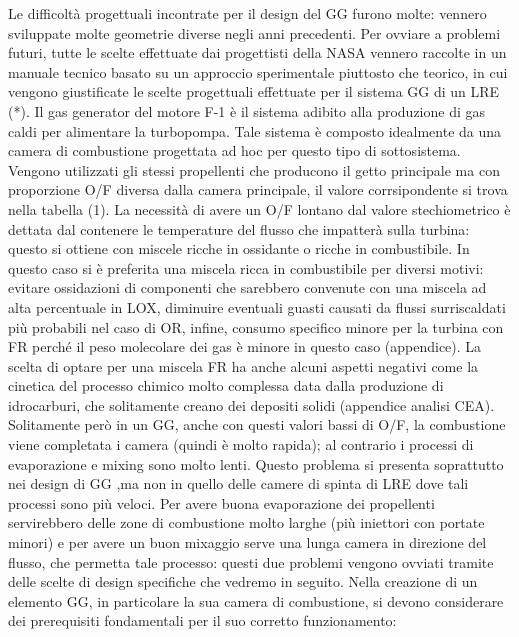 \documentclass[11pt,a4paper,twocolumn]{article}
\begin{document}
\label{sec:gas generator}

Le difficoltà progettuali incontrate per il design del GG furono molte: vennero sviluppate molte geometrie diverse negli anni precedenti. Per ovviare a problemi futuri, tutte le scelte effettuate dai progettisti della NASA vennero raccolte in un manuale tecnico basato su un approccio sperimentale piuttosto che teorico, in cui vengono giustificate le scelte progettuali effettuate per il sistema GG di un LRE (*).
Il gas generator del motore F-1 è il sistema adibito alla produzione di gas caldi per alimentare la turbopompa. Tale sistema è composto idealmente da una camera di combustione progettata ad hoc per questo tipo di sottosistema. Vengono utilizzati gli stessi propellenti che producono il getto principale ma con proporzione O/F diversa dalla camera principale, il valore corrsipondente si trova nella tabella (1). La necessità di avere un O/F lontano dal valore stechiometrico è dettata dal contenere le temperature del flusso che impatterà sulla turbina: questo si ottiene con miscele ricche in ossidante o ricche in combustibile. In questo caso si è preferita una miscela ricca in combustibile per diversi motivi: evitare ossidazioni di componenti che sarebbero convenute con una miscela ad alta percentuale in LOX, diminuire eventuali guasti causati da flussi surriscaldati più probabili nel caso di OR, infine, consumo specifico minore per la turbina con FR perché il peso molecolare dei gas è minore in questo caso (appendice). La scelta di optare per una miscela FR ha anche alcuni aspetti negativi come la cinetica del processo chimico molto complessa data dalla produzione di idrocarburi, che solitamente creano dei depositi solidi (appendice analisi CEA). Solitamente però in un GG, anche con questi valori bassi di O/F,  la combustione viene completata i camera (quindi è molto rapida); al contrario i processi di evaporazione e mixing sono molto lenti. Questo problema si presenta soprattutto nei design di GG ,ma non in quello delle camere di spinta di LRE dove tali processi sono più veloci. Per avere buona evaporazione dei propellenti servirebbero delle zone di combustione molto larghe (più iniettori con portate minori) e per avere un buon mixaggio serve una lunga camera in direzione del flusso, che permetta tale processo: questi due problemi vengono ovviati tramite delle scelte di design specifiche che vedremo in seguito. 
Nella creazione di un elemento GG, in particolare la sua camera di combustione, si devono considerare dei prerequisiti fondamentali per il suo corretto funzionamento:
\end{document}
